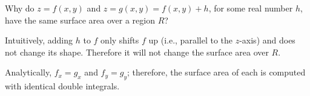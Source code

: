 {Why do $z=f(x,y)$ and $z=g(x,y)=f(x,y)+h$, for some real number $h$, have the same surface area over a region $R$? 
}
{Intuitively, adding $h$ to $f$ only shifts $f$ up (i.e., parallel to the $z$-axis) and does not change its shape. Therefore it will not change the surface area over $R$. 

Analytically, $f_x = g_x$ and $f_y=g_y$; therefore, the surface area of each is computed with identical double integrals.
}